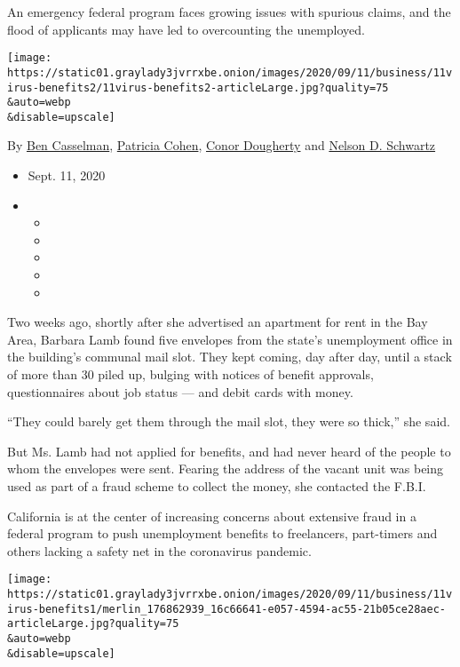 An emergency federal program faces growing issues with spurious claims,
and the flood of applicants may have led to overcounting the unemployed.

\texttt{[image: https://static01.graylady3jvrrxbe.onion/images/2020/09/11/business/11virus-benefits2/11virus-benefits2-articleLarge.jpg?quality=75\\\&auto=webp\\\&disable=upscale]}

By \href{https://www.nytimes3xbfgragh.onion/by/ben-casselman}{Ben
Casselman},
\href{https://www.nytimes3xbfgragh.onion/by/patricia-cohen}{Patricia
Cohen},
\href{https://www.nytimes3xbfgragh.onion/by/conor-dougherty}{Conor
Dougherty} and
\href{https://www.nytimes3xbfgragh.onion/by/nelson-d-schwartz}{Nelson D.
Schwartz}

\begin{itemize}
\item
  Sept. 11, 2020
\item
  \begin{itemize}
  \item
  \item
  \item
  \item
  \item
  \end{itemize}
\end{itemize}

Two weeks ago, shortly after she advertised an apartment for rent in the
Bay Area, Barbara Lamb found five envelopes from the state's
unemployment office in the building's communal mail slot. They kept
coming, day after day, until a stack of more than 30 piled up, bulging
with notices of benefit approvals, questionnaires about job status ---
and debit cards with money.

``They could barely get them through the mail slot, they were so
thick,'' she said.

But Ms. Lamb had not applied for benefits, and had never heard of the
people to whom the envelopes were sent. Fearing the address of the
vacant unit was being used as part of a fraud scheme to collect the
money, she contacted the F.B.I.

California is at the center of increasing concerns about extensive fraud
in a federal program to push unemployment benefits to freelancers,
part-timers and others lacking a safety net in the coronavirus pandemic.

\texttt{[image: https://static01.graylady3jvrrxbe.onion/images/2020/09/11/business/11virus-benefits1/merlin\_176862939\_16c66641-e057-4594-ac55-21b05ce28aec-articleLarge.jpg?quality=75\\\&auto=webp\\\&disable=upscale]}


